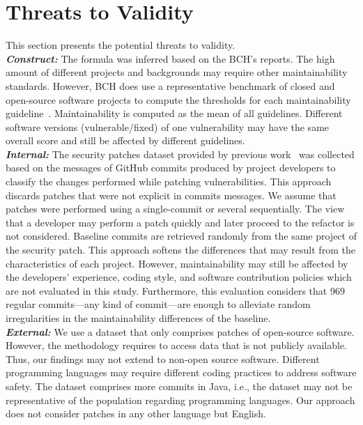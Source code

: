 \documentclass[10pt,conference]{IEEEtran}
\begin{document}
\section{Threats to Validity}\label{sec:threats}
%
This section presents the potential threats to validity.
%
\\\textit{\textbf{Construct:}} The formula was inferred based 
on the BCH's reports. The high amount of different projects and backgrounds 
may require other maintainability standards. However, BCH does use a 
representative benchmark of closed and open-source software projects to compute 
the thresholds for each maintainability guideline~\cite{Visser:2016:OREILLY, Baggen2012}.
Maintainability is computed as the mean of all guidelines. Different software versions 
(vulnerable/fixed) of one vulnerability may have the same overall score
and still be affected by different guidelines.
%
\\\textit{\textbf{Internal:}} The security patches dataset provided by previous
work~\cite{Reis:2017:IJSSE} was collected based on the messages of GitHub
commits produced by project developers to classify the changes performed while 
patching vulnerabilities. This approach discards patches that were
not explicit in commits messages. We assume that patches were performed 
using a single-commit or several sequentially. The view that a 
developer may perform a patch quickly and later proceed to the refactor is not considered.
Baseline commits are retrieved randomly from the same project of the security patch.
This approach softens the differences
that may result from the characteristics of each project. However,
maintainability may still be affected by the developers' experience, coding
style, and software contribution policies which are not evaluated in this study.
Furthermore, this evaluation considers that $969$ regular commits---any kind
of commit---are enough to
alleviate random irregularities in the maintainability differences of the
baseline. 
%
\\\textit{\textbf{External:}} We use a dataset that only comprises patches of open-source software.
However, the methodology requires to access data that is not publicly available.
Thus, our findings may not extend to non-open source software. Different programming 
languages may require different coding practices to address software safety. The 
dataset comprises more commits in Java, i.e., the dataset may not be representative 
of the population regarding programming languages. Our approach does not consider 
patches in any other language but English.
\end{document}
